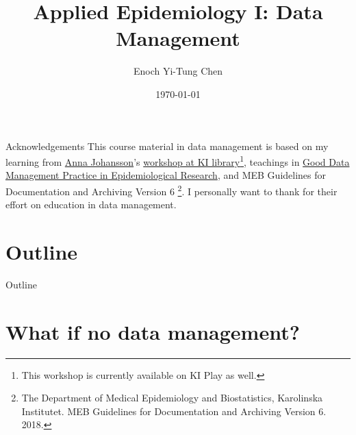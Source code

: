 


\title[Applied Epi I: Data Management]{Applied Epidemiology I: Data Management}
\date{\today}
\author[Enoch Yi-Tung Chen]{Enoch Yi-Tung Chen}




\begin{frame}
\maketitle 
\end{frame}

\begin{frame}{Acknowledgements}
This course material in data management is based on my learning from \href{https://staff.ki.se/people/annajo}{Anna Johansson}'s \href{https://play.ki.se/media/Data+Management+and+research+documentation+for+researchers/0_h64ki6v7?_ga=2.131118287.1557257458.1589785892-1364153581.1557067020}{workshop at KI library}\footnote{This workshop is currently available on KI Play as well. }, teachings in \href{https://kiwas.ki.se/katalog/katalog/kurs/851;jsessionid=e42ee2c1f6b081f28bf83e3d0321?lang=en}{Good Data Management Practice in Epidemiological Research}, and MEB Guidelines for Documentation and Archiving Version 6 \footnote{The Department of Medical Epidemiology and Biostatistics, Karolinska Institutet. MEB Guidelines for Documentation and Archiving Version 6. 2018.}. I personally want to thank for their effort on education in data management.

\end{frame}

\section*{Outline}
\begin{frame}{Outline}
          \tableofcontents
\end{frame}

\section{What if no data management?}

